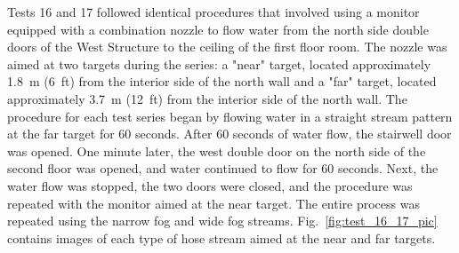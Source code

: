 \documentclass[12pt,oneside]{book}
\begin{document}
Tests 16 and 17 followed identical procedures that involved using a monitor equipped with a combination nozzle to flow water from the north side double doors of the West Structure to the ceiling of the first floor room. The nozzle was aimed at two targets during the series: a "near" target, located approximately 1.8~m (6~ft) from the interior side of the north wall and a "far" target, located approximately 3.7~m (12~ft) from the interior side of the north wall. The procedure for each test series began by flowing water in a straight stream pattern at the far target for 60 seconds. After 60 seconds of water flow, the stairwell door was opened. One minute later, the west double door on the north side of the second floor was opened, and water continued to flow for 60 seconds. Next, the water flow was stopped, the two doors were closed, and the procedure was repeated with the monitor aimed at the near target. The entire process was repeated using the narrow fog and wide fog streams. Fig.~\ref{fig:test_16_17_pic} contains images of each type of hose stream aimed at the near and far targets.
\end{document}
